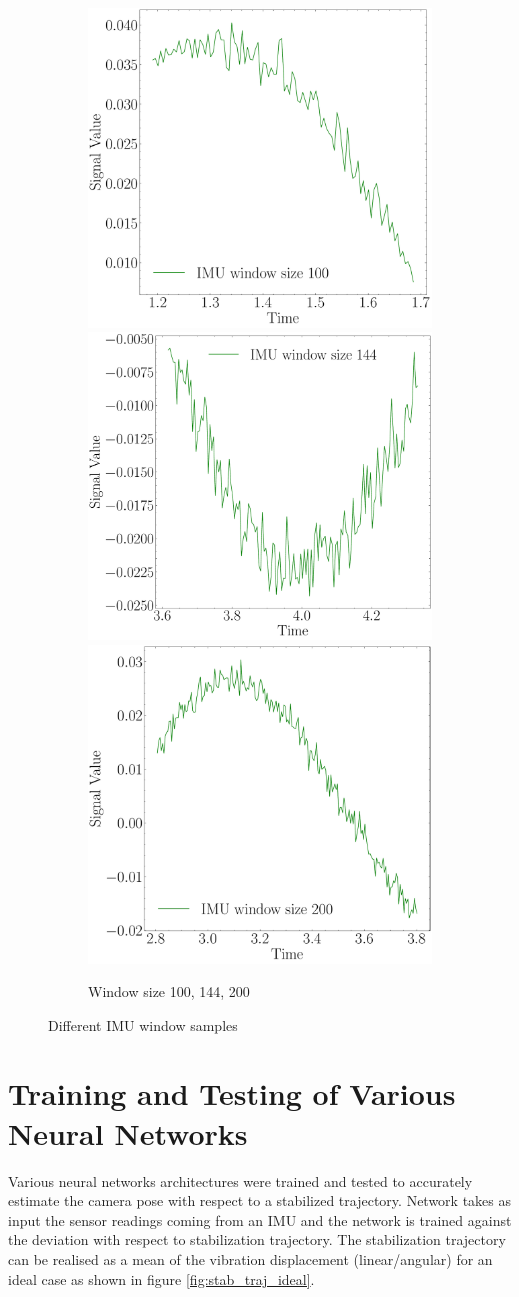 \begin{figure}[H]
    \begin{subfigure}{\linewidth}
    \includegraphics[width=.3\linewidth]{images/fig_chapter4/imu_windows/imu_window_size_100.pdf}\hfill
    \includegraphics[width=.3\linewidth]{images/fig_chapter4/imu_windows/imu_window_size_144.pdf}\hfill
    \includegraphics[width=.3\linewidth]{images/fig_chapter4/imu_windows/imu_window_size_200.pdf}\hfill
    \caption{Window size 100, 144, 200}
    \end{subfigure}
\caption{Different IMU window samples}
\label{fig:imu_window_samples}
\end{figure}

\section{Training and Testing of Various Neural Networks}
Various neural networks architectures were trained and tested to accurately estimate the camera pose with respect to a stabilized trajectory. Network takes as input the sensor readings coming from an IMU and the network is trained against the deviation with respect to stabilization trajectory. The stabilization trajectory can be realised as a mean of the vibration displacement (linear/angular) for an ideal case as shown in figure \ref{fig:stab_traj_ideal}. 

